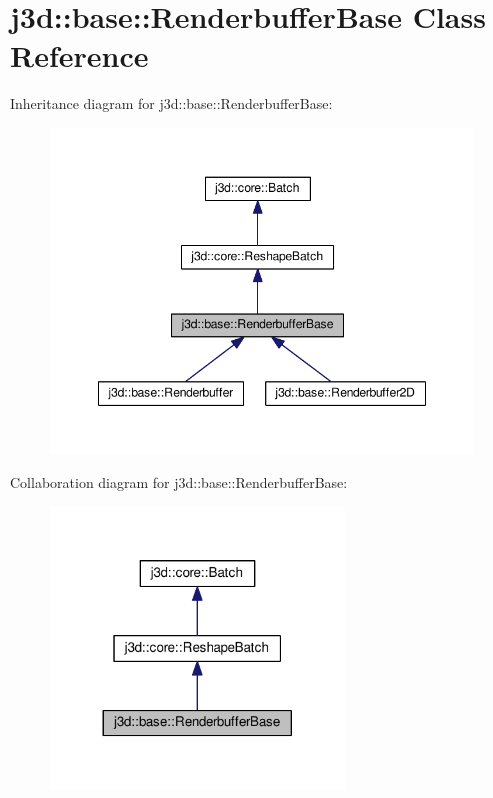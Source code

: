 \hypertarget{classj3d_1_1base_1_1RenderbufferBase}{}\section{j3d\+:\+:base\+:\+:Renderbuffer\+Base Class Reference}
\label{classj3d_1_1base_1_1RenderbufferBase}


Inheritance diagram for j3d\+:\+:base\+:\+:Renderbuffer\+Base\+:
\nopagebreak
\begin{figure}[H]
\begin{center}
\leavevmode
\includegraphics[width=348pt]{classj3d_1_1base_1_1RenderbufferBase__inherit__graph}
\end{center}
\end{figure}


Collaboration diagram for j3d\+:\+:base\+:\+:Renderbuffer\+Base\+:
\nopagebreak
\begin{figure}[H]
\begin{center}
\leavevmode
\includegraphics[width=221pt]{classj3d_1_1base_1_1RenderbufferBase__coll__graph}
\end{center}
\end{figure}

